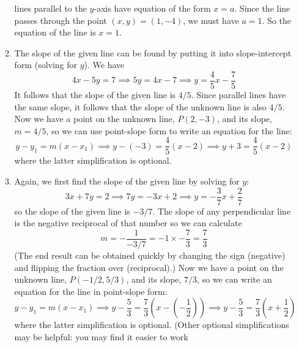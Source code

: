 \documentclass{article}
\begin{document}
\begin{enumerate}
\begin{enumerate}
    lines parallel to the $y$-axis have equation of the form $x=a$.
    Since the line passes through the point $(x,y)=(1,-4)$, we must
    have $a=1$.  So the equation of the line is $x=1$.
  \item %
    The slope of the given line can be found by putting it into
    slope-intercept form (solving for $y$).  We have
    \begin{equation*}
      4x-5y=7 \implies 5y = 4x-7 \implies y = \frac{4}{5} x -
      \frac{7}{5}
    \end{equation*}
    It follows that the slope of the given line is $4/5$.  Since
    parallel lines have the same slope, it follows that the slope of
    the unknown line is also $4/5$.  Now we have a point on the
    unknown line, $P(2,-3)$, and its slope, $m=4/5$, so we can use 
    point-slope form to write an equation for the line:
    \begin{equation*}
      y-y_1 = m(x-x_1) \implies y-(-3) = \frac{4}{5} (x-2)
      \implies y+3 = \frac{4}{5} (x-2)
    \end{equation*}
    where the latter simplification is optional.
  \item %
    Again, we first find the slope of the given line by solving for
    $y$:
    \begin{equation*}
      3x+7y=2 \implies 7y = -3x + 2 \implies y = -\frac{3}{7} x +
      \frac{2}{7}
    \end{equation*}
    so the slope of the given line is $-3/7$.  The slope of any
    perpendicular line is the negative reciprocal of that number so we
    can calculate
    \begin{equation*}
      m = -\frac{1}{-3/7} = -1 \times -\frac{7}{3} = \frac{7}{3}
    \end{equation*}
    (The end result can be obtained quickly by changing the sign
    (negative) and flipping the fraction over (reciprocal).)  Now we
    have a point on the unknown line, $P(-1/2,5/3)$, and its slope,
    $7/3$, so we can write an equation for the line in point-slope
    form:
    \begin{equation*}
      y-y_1 = m(x-x_1) 
      \implies 
      y-\frac{5}{3} = \frac{7}{3}\left(x-\left(-\frac{1}{2}\right)\right) 
      \implies y-\frac{5}{3} = \frac{7}{3}\left(x+\frac{1}{2}\right)
    \end{equation*}
    where the latter simplification is optional.  (Other optional
    simplifications may be helpful: you may find it easier to work

\end{enumerate}
\end{enumerate}
\end{document}
